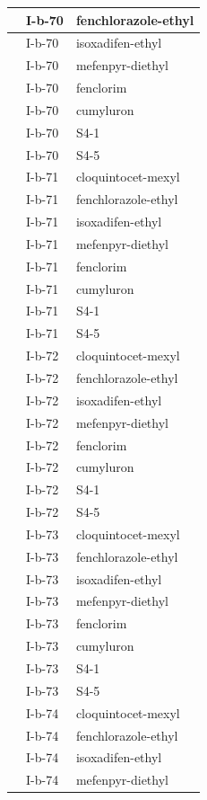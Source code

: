 \documentclass[11pt,a4paper]{article}
\begin{document}
\begin{table}[h]
\begin{tabular}{|l|l|l|}
 & I-b-70 & fenchlorazole-ethyl \\ \hline
 & I-b-70 & isoxadifen-ethyl \\ \hline
 & I-b-70 & mefenpyr-diethyl \\ \hline
 & I-b-70 & fenclorim \\ \hline
 & I-b-70 & cumyluron \\ \hline
 & I-b-70 & S4-1 \\ \hline
 & I-b-70 & S4-5 \\ \hline
 & I-b-71 & cloquintocet-mexyl \\ \hline
 & I-b-71 & fenchlorazole-ethyl \\ \hline
 & I-b-71 & isoxadifen-ethyl \\ \hline
 & I-b-71 & mefenpyr-diethyl \\ \hline
 & I-b-71 & fenclorim \\ \hline
 & I-b-71 & cumyluron \\ \hline
 & I-b-71 & S4-1 \\ \hline
 & I-b-71 & S4-5 \\ \hline
 & I-b-72 & cloquintocet-mexyl \\ \hline
 & I-b-72 & fenchlorazole-ethyl \\ \hline
 & I-b-72 & isoxadifen-ethyl \\ \hline
 & I-b-72 & mefenpyr-diethyl \\ \hline
 & I-b-72 & fenclorim \\ \hline
 & I-b-72 & cumyluron \\ \hline
 & I-b-72 & S4-1 \\ \hline
 & I-b-72 & S4-5 \\ \hline
 & I-b-73 & cloquintocet-mexyl \\ \hline
 & I-b-73 & fenchlorazole-ethyl \\ \hline
 & I-b-73 & isoxadifen-ethyl \\ \hline
 & I-b-73 & mefenpyr-diethyl \\ \hline
 & I-b-73 & fenclorim \\ \hline
 & I-b-73 & cumyluron \\ \hline
 & I-b-73 & S4-1 \\ \hline
 & I-b-73 & S4-5 \\ \hline
 & I-b-74 & cloquintocet-mexyl \\ \hline
 & I-b-74 & fenchlorazole-ethyl \\ \hline
 & I-b-74 & isoxadifen-ethyl \\ \hline
 & I-b-74 & mefenpyr-diethyl \\ \hline

\end{tabular}
\end{table}
\end{document}
